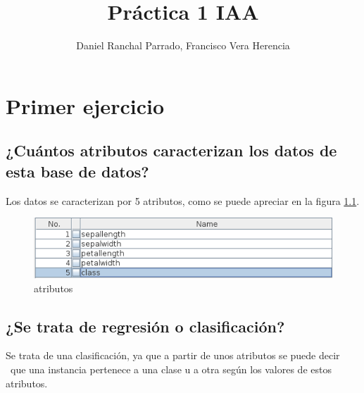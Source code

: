 \documentclass[11pt,twoside,a4paper]{book}
\title{\Huge Práctica 1 IAA}
\author{Daniel Ranchal Parrado, Francisco Vera Herencia}
\date{\parbox{\linewidth}{\centering%
  \today\endgraf\bigskip
  32 horas de trabajo}}
\begin{document}
\maketitle
%
%

\renewcommand\bibname{Bibliografía}
\renewcommand\tablename{Tabla}

 \fancyhf{} \pagestyle{fancy}
\fancyhead[LO]{\leftmark} %
\fancyhead[RE]{\leftmark} %
\fancyhead[RO,LE]{\thepage} %
\setlength{\headheight}{14pt}
\renewcommand{\sectionmark}[1]{\markright{{\thesection. #1}}} %

\tableofcontents
\listoffigures

\chapter{Primer ejercicio}
\section{¿Cuántos atributos caracterizan los datos de esta base de datos?}
Los datos se caracterizan por 5 atributos, como se puede apreciar en la figura \ref{Fig1}.
\begin{figure}[H]
   \includegraphics[width=\textwidth]{attributes.png}
   \caption{atributos}
   \label{Fig1}
\end{figure}

\section{¿Se trata de regresión o clasificación?}
Se trata de una clasificación, ya que a partir de unos atributos se puede decir \
que una instancia pertenece a una clase u a otra según los valores de estos atributos.
\end{document}
